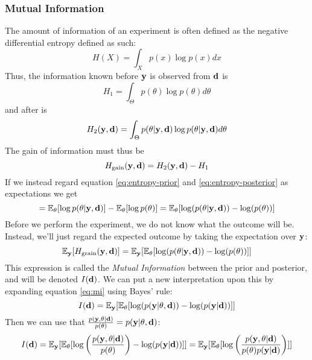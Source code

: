\subsubsection{Mutual Information}
The amount of information of an experiment is often defined as the negative differential entropy defined as such\cite{lindley56}:
\begin{equation}H(X) = \int_{X}p(x)\log p(x)dx\end{equation}
Thus, the information known before $\mathbf{y}$ is observed from $\mathbf{d}$ is
\begin{equation}\label{eq:entropy-prior}H_1 = \int_{\Theta}p(\theta)\log p(\theta)d\theta\end{equation}
and after is
\begin{equation}\label{eq:entropy-posterior}H_2(\mathbf{y}, \mathbf{d}) = \int_{\Theta}p(\theta| \mathbf{y}, \mathbf{d})\log p(\theta| \mathbf{y}, \mathbf{d})d\theta\end{equation}
The gain of information must thus be
\begin{equation}H_\textrm{gain}(\mathbf{y}, \mathbf{d}) = H_2(\mathbf{y}, \mathbf{d}) - H_1\end{equation}
If we instead regard equation \ref{eq:entropy-prior} and \ref{eq:entropy-posterior} as expectations we get
\begin{equation} = \mathbb{E}_\theta[\log p(\theta | \mathbf{y}, \mathbf{d})] - \mathbb{E}_\theta [\log p(\theta )]  = \mathbb{E}_\theta [\log(p(\theta | \mathbf{y}, \mathbf{d})) - \log(p(\theta))]\end{equation}
Before we perform the experiment, we do not know what the outcome will be. Instead, we'll just regard the expected outcome by taking the expectation over $\mathbf{y}$:
\begin{equation} \label{eq:mi}\mathbb{E}_{\mathbf{y}}[H_\textrm{grain}(\mathbf{y}, \mathbf{d})]  = \mathbb{E}_{\mathbf{y}}[\mathbb{E}_\theta [\log(p(\theta | \mathbf{y}, \mathbf{d})) - \log(p(\theta))]]\end{equation}
This expression is called the \textit{Mutual Information} between the prior and posterior, and will be denoted $I(\mathbf{d})$.
We can put a new interpretation upon this by expanding equation \ref{eq:mi} using Bayes' rule:
\begin{equation} I(\mathbf{d})  = \mathbb{E}_{\mathbf{y}}[\mathbb{E}_\theta [\log(p(\mathbf{y} | \mathbf{\theta}, \mathbf{d})) - \log(p(\mathbf{y}|\mathbf{d}))]]\end{equation}
Then we can use that $\frac{p(\mathbf{y}, \mathbf{\theta}|\mathbf{d})}{p(\theta)}=p(\mathbf{y| \theta, \mathbf{d}})$:
\begin{equation} I(\mathbf{d})  = \mathbb{E}_{\mathbf{y}}[\mathbb{E}_\theta [\log\left(\frac{p(\mathbf{y}, \mathbf{\theta}|\mathbf{d})}{p(\theta)}\right) - \log(p(\mathbf{y}|\mathbf{d}))]] = \mathbb{E}_{\mathbf{y}}[\mathbb{E}_\theta [\log\left(\frac{p(\mathbf{y}, \mathbf{\theta}|\mathbf{d})}{p(\theta)p(\mathbf{y}|\mathbf{d})}\right)]]\end{equation}
